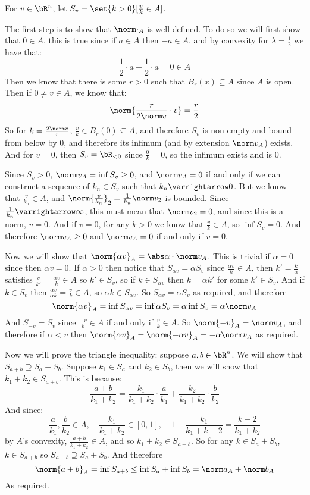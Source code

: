 \documentclass[10pt]{article}
\begin{document}
\begin{blankpp}

    For $v\in\bR^n$, let $S_v = \set{k>0}[\frac vk\in A]$.

    The first step is to show that $\norm\cdot_A$ is well-defined.
    To do so we will first show that $0\in A$, this is true since if $a\in A$ then $-a\in A$, and by convexity for $\lambda=\frac12$
    we have that:
        \[ \frac12\cdot a - \frac12\cdot a = 0 \in A \]
    Then we know that there is some $r>0$ such that $B_r(x)\subseteq A$ since $A$ is open.
    Then if $0\neq v\in A$, we know that:
        \[ \norm{\frac r{2\norm v}\cdot v} = \frac r2 \]
    So for $k=\frac{2\norm v}r$, $\frac vk\in B_r(0)\subseteq A$, and therefore $S_v$ is non-empty and bound from below by $0$,
    and therefore its infimum (and by extension $\norm v_A$) exists.
    And for $v=0$, then $S_v=\bR_{<0}$ since $\frac 0k=0$, so the infimum exists and is $0$.

    Since $S_v>0$, $\norm v_A = \inf S_v\geq0$, and $\norm v_A=0$ if and only if we can construct a sequence of $k_n\in S_v$ such
    that $k_n\varrightarrow0$.
    But we know that $\frac v{k_n}\in A$, and $\norm{\frac v{k_n}}_2=\frac1{k_n}\norm v_2$ is bounded.
    Since $\frac1{k_n}\varrightarrow\infty$, this must mean that $\norm v_2=0$, and since this is a norm, $v=0$.
    And if $v=0$, for any $k>0$ we know that $\frac vk\in A$, so $\inf S_v=0$.
    And therefore $\norm v_A\geq0$ and $\norm v_A=0$ if and only if $v=0$.

    Now we will show that $\norm{\alpha v}_A=\abs\alpha\cdot\norm v_A$.
    This is trivial if $\alpha=0$ since then $\alpha v=0$.
    If $\alpha>0$ then notice that $S_{\alpha v}=\alpha S_v$ since $\frac{\alpha v}k\in A$, then $k'=\frac k\alpha$ satisfies
    $\frac v{k'}=\frac{\alpha v}k\in A$ so $k'\in S_v$, so if $k\in S_{\alpha v}$ then $k=\alpha k'$ for some $k'\in S_v$.
    And if $k\in S_v$ then $\frac{\alpha v}{\alpha k}=\frac vk\in A$, so $\alpha k\in S_{\alpha v}$.
    So $S_{\alpha v}=\alpha S_v$ as required, and therefore
        \[ \norm{\alpha v}_A = \inf S_{\alpha v} = \inf\alpha S_v = \alpha\inf S_v = \alpha\norm v_A \]
    And $S_{-v}=S_v$ since $\frac{-v}k\in A$ if and only if $\frac vk\in A$.
    So $\norm{-v}_A = \norm v_A$, and therefore if $\alpha<v$ then $\norm{\alpha v}_A=\norm{-\alpha v}_A=-\alpha\norm v_A$ as
    required.

    Now we will prove the triangle inequality: suppose $a,b\in\bR^n$.
    We will show that $S_{a+b}\supseteq S_a + S_b$.
    Suppose $k_1\in S_a$ and $k_2\in S_b$, then we will show that $k_1+k_2\in S_{a+b}$.
    This is because:
        \[ \frac{a+b}{k_1+k_2} = \frac{k_1}{k_1+k_2}\cdot\frac{a}{k_1} + \frac{k_2}{k_1+k_2}\cdot\frac{b}{k_2} \]
    And since:
        \[ \frac a{k_1}, \frac b{k_2}\in A, \quad \frac{k_1}{k_1+k_2}\in[0,1], \quad 1-\frac{k_1}{k_1+k-2} = \frac{k-2}{k_1+k_2} \]
    by $A$'s convexity, $\frac{a+b}{k_1+k_2}\in A$, and so $k_1+k_2\in S_{a+b}$.
    So for any $k\in S_a+S_b$, $k\in S_{a+b}$ so $S_{a+b}\supseteq S_a + S_b$.
    And therefore
        \[ \norm{a+b}_A = \inf S_{a+b} \leq \inf S_a + \inf S_b = \norm a_A + \norm b_A \]
    As required.


\end{blankpp}
\end{document}
